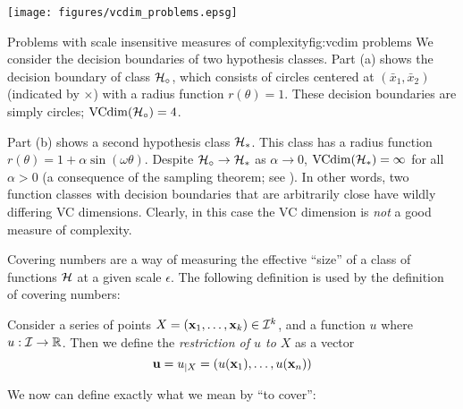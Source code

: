 \begin{linefigure}
\begin{center}
\texttt{[image: figures/vcdim\_problems.epsg]}
\end{center}
\begin{capt}{Problems with scale insensitive measures of
complexity}{fig:vcdim problems}
We consider the decision boundaries of two hypothesis classes.  Part
(a) shows the decision boundary of class $\mathcal{H}_{\circ}$,
which consists of circles centered at $(\bar{x}_1, \bar{x}_2)$
(indicated by $\times$) with a radius function $r(\theta) = 1$.  These
decision boundaries are simply circles; $\mathrm{VCdim}(\mathcal{H}_{\circ}) = 4$.

Part (b) shows a second hypothesis class $\mathcal{H}_{\ast}$.  This class
has a radius function $r(\theta) = 1 + \alpha \sin(\omega \theta)$.
Despite $\mathcal{H}_{\circ} \rightarrow \mathcal{H}_{\ast}$ as $\alpha
\rightarrow 0$, $\mathrm{VCdim}(\mathcal{H}_{\ast}) = \infty$ for all $\alpha >
0$ (a consequence of the sampling theorem; see \cite{Cherkassky98}).
In other words, two function classes with 
decision boundaries that are arbitrarily close have wildly differing
VC dimensions.  Clearly, in this case the VC dimension is \emph{not} a
good measure of complexity.
\end{capt}
\end{linefigure}

Covering numbers are a way of measuring the effective ``size'' of a
class of functions $\mathcal{H}$ at a given scale $\epsilon$.  The following
definition is used by the definition of covering numbers:

\begin{definition}
\label{def:restriction}
Consider a series of points $X = (\mathbf{x}_1, \ldots, \mathbf{x}_k) \in \mathcal{I}^k$,
and a function $u$ where $u : \mathcal{I} \rightarrow \mathbb{R}$.  Then
we define the \emph{restriction of $u$ to $X$} as a vector
%
\begin{equation}
\mathbf{u} = u_{|X} = (u(\mathbf{x}_1), \ldots, u(\mathbf{x}_n))
\end{equation}
\end{definition}

We now can define exactly what we mean by ``to cover'':

